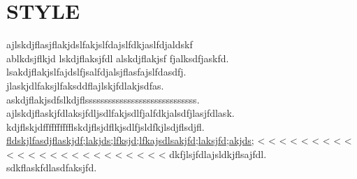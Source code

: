 \documentclass{ctexart}
\begin{document}
\section{STYLE}
\indent\tiny ajlskdjflasjflakjdslfakjslfdajslfdkjaslfdjaldskf\\
\small ablkdsjflkjd lskdjflaksjfdl alskdjflakjsf fjalksdfjaskfd.\\
\footnotesize lsakdjflakjslfajdslfjsalfdjalsjflasfajslfdasdfj.\\
\normalsize jlaskjdlfaksjlfaksddflajlskjfdlakjsdfas.\\
\large askdjflakjsdfslkdjflsssssssssssssssssssssssssssss.\\
\Large ajlskdjflaskjfdlaksjfdljsdlfakjsdlfjalfdkjalsdfjlasjfdlask.\\
\huge kdjflskjdfffffffffflskdjflsjdflkjsdlfjsldfkjlsdjflsdjfl.\\
{\Huge \underline{fldskjlfasdjflaskjdf;lakjds;lfksjd;lfkajsdlsakjfd;laksjfd;akjds;}}
< < < < < < < < < < < < < < < < < < < < < < < <
dkfjlsjfdlajsldkjflsajfdl.\\
\normalsize \indent sdkflaskfdlasdfaksjfd.
\end{document}
